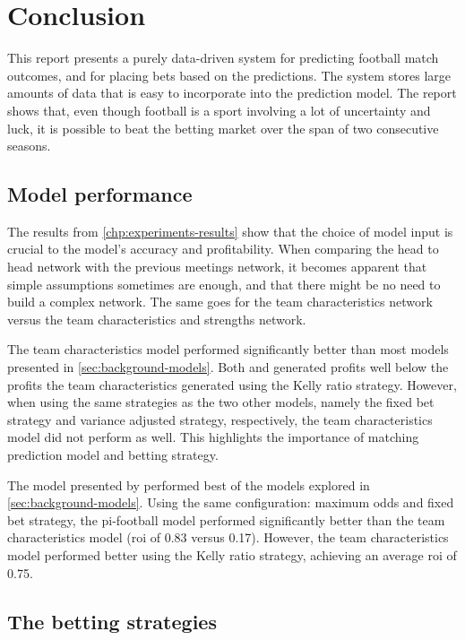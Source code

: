 \section{Conclusion}

This report presents a purely data-driven system for predicting football match outcomes, and for placing bets based on the predictions. The system stores large amounts of data that is easy to incorporate into the prediction model. The report shows that, even though football is a sport involving a lot of uncertainty and luck, it is possible to beat the  betting market over the span of two consecutive seasons.


\subsection{Model performance}

The results from \cref{chp:experiments-results} show that the choice of model input is crucial to the model's accuracy and profitability. When comparing the head to head network with the previous meetings network, it becomes apparent that simple assumptions sometimes are enough, and that there might be no need to build a complex network. The same goes for the team characteristics network versus the team characteristics and strengths network.

The team characteristics model performed significantly better than most models presented in \cref{sec:background-models}. Both \citet{bib:koopman-lit-2015} and \citet{bib:rue-salvesen-2000} generated profits well below the profits the team characteristics generated using the Kelly ratio strategy. However, when using the same strategies as the two other models, namely the fixed bet strategy and variance adjusted strategy, respectively, the team characteristics model did not perform as well. This highlights the importance of matching prediction model and betting strategy.

The model presented by \citet{bib:constantinou-fenton-neil-2012} performed best of the models explored in \cref{sec:background-models}. Using the same configuration: maximum odds and fixed bet strategy, the pi-football model performed significantly better than the team characteristics model (\gls{roi} of 0.83 versus 0.17). However, the team characteristics model performed better using the Kelly ratio strategy, achieving an average \gls{roi} of 0.75.


\subsection{The betting strategies}

